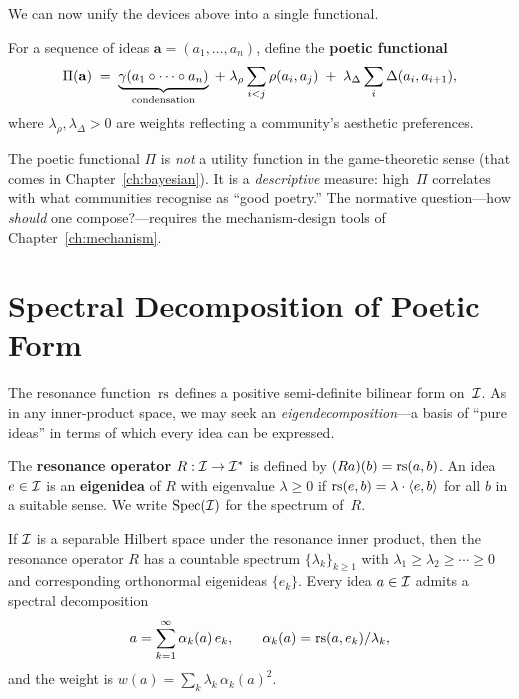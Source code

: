 We can now unify the devices above into a single functional.

\begin{definition}
\label{def:poetic-functional}
For a sequence of ideas $\mathbf{a} = (a_1,\ldots,a_n)$, define
the \textbf{poetic functional}
\[
  \Pi(\mathbf{a})
  \;=\;
  \underbrace{\gamma(a_1\circ\cdots\circ a_n)}_{\text{condensation}}
  \;+\;
  \lambda_\rho \sum_{i<j} \rho(a_i,a_j)
  \;+\;
  \lambda_\Delta \sum_{i} \Delta(a_i,a_{i+1}),
\]
where $\lambda_\rho, \lambda_\Delta > 0$ are weights reflecting
a community's aesthetic preferences.
\end{definition}

\begin{remark}
The poetic functional $\Pi$ is \emph{not} a utility function in
the game-theoretic sense (that comes in Chapter~\ref{ch:bayesian}).
It is a \emph{descriptive} measure: high~$\Pi$ correlates with what
communities recognise as ``good poetry.''  The normative question---how
\emph{should} one compose?---requires the mechanism-design tools
of Chapter~\ref{ch:mechanism}.
\end{remark}

\section{Spectral Decomposition of Poetic Form}
\label{sec:spectral-poetics}

The resonance function~$\mathrm{rs}$ defines a positive semi-definite bilinear
form on~$\mathcal{I}$.  As in any inner-product space, we may seek an
\emph{eigendecomposition}---a basis of ``pure ideas'' in terms of which
every idea can be expressed.

\begin{definition}
\label{def:resonance-operator}
The \textbf{resonance operator} $R : \mathcal{I} \to \mathcal{I}^*$ is defined by
$(Ra)(b) = \mathrm{rs}(a,b)$.  An idea $e \in \mathcal{I}$ is an \textbf{eigenidea}
of $R$ with eigenvalue $\lambda \ge 0$ if $\mathrm{rs}(e,b) = \lambda \cdot
\langle e, b \rangle$ for all $b$ in a suitable sense.  We write
$\mathrm{Spec}(\mathcal{I})$ for the spectrum of~$R$.
\end{definition}

\begin{theorem}
\label{thm:spectral-poetics}
If $\mathcal{I}$ is a separable Hilbert space under the resonance inner product,
then the resonance operator $R$ has a countable spectrum $\{\lambda_k\}_{k \ge 1}$
with $\lambda_1 \ge \lambda_2 \ge \cdots \ge 0$ and corresponding
orthonormal eigenideas $\{e_k\}$.  Every idea $a \in \mathcal{I}$ admits a
spectral decomposition
\[
  a = \sum_{k=1}^{\infty} \alpha_k(a)\, e_k,
  \qquad \alpha_k(a) = \mathrm{rs}(a, e_k)/\lambda_k,
\]
and the weight is $w(a) = \sum_k \lambda_k\, \alpha_k(a)^2$.
\end{theorem}

